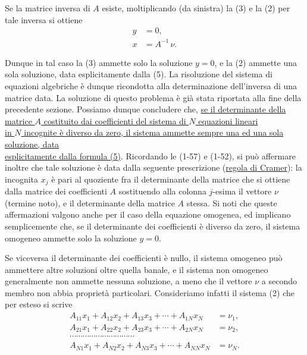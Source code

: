 \documentclass[11pt, a4paper]{book}
\numberwithin{equation}{section}
\begin{document}
Se la matrice inversa di $A$ esiste, moltiplicando (da sinistra) la (3) e
la (2) per tale inversa si ottiene
\begin{align}
y &= 0, \label{eq:3.2.4} \\
x &= A^{-1}\, \nu. \label{eq:3.2.5}
\end{align}

Dunque in tal caso la (3) ammette solo la soluzione $y = 0$, e la (2)
ammette una sola soluzione, data esplicitamente dalla (5). La risoluzione
del sistema di equazioni algebriche è dunque ricondotta alla determinazione
dell'inversa di una matrice data. La soluzione di questo problema è già
stata riportata alla fine della precedente sezione. Possiamo dunque
concludere che, \uline{se il determinante della matrice $A$ costituito
dai coefficienti del sistema di $N$ equazioni lineari} 
\\ \uline{in $N$ incognite è 
diverso da zero, il sistema ammette sempre una ed una sola soluzione, data} \\ \uline{
esplicitamente dalla formula (5)}. Ricordando le (1-57) e (1-52), si può
affermare inoltre che tale soluzione è data dalla seguente prescrizione
(\uline{regola di Cramer}): la incognita $x_j$ è pari al quoziente fra
il determinante della matrice che si ottiene dalla matrice dei coefficienti
$A$ sostituendo alla colonna $j$-esima il vettore $\nu$ (termine noto), e
il determinante della matrice $A$ stessa. Si noti che queste affermazioni
valgono anche per il caso della equazione omogenea, ed implicano
semplicemente che, se il determinante dei coefficienti è diverso da zero,
il sistema omogeneo ammette solo la soluzione $y = 0$.

Se viceversa il determinante dei coefficienti è nullo, il sistema omogeneo
può ammettere altre soluzioni oltre quella banale, e il sistema non
omogeneo generalmente non ammette nessuna soluzione, a meno che il vettore
$\nu$ a secondo membro non abbia proprietà particolari. Consideriamo
infatti il sistema (2) che per esteso si scrive
\begin{align*}
A_{11} x_1 + A_{12} x_2 + A_{13} x_3 + \cdots + A_{1N} x_N &= \nu_1, \\
A_{21} x_1 + A_{22} x_2 + A_{23} x_3 + \cdots + A_{2N} x_N &= \nu_2, \\
\cdots\cdots\cdots\cdots\cdots\cdots\cdots\cdots\cdots\cdots & \\
A_{N1} x_1 + A_{N2} x_2 + A_{N3} x_3 + \cdots + A_{NN} x_N &= \nu_N.
\tag{2}
\end{align*}
\end{document}
